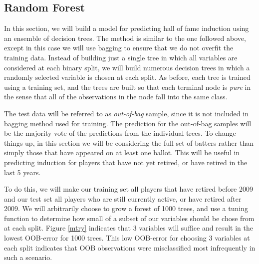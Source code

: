 \documentclass[preprint,12pt]{elsarticle}
\begin{document}


\subsection{Random Forest}
In this section, we will build a model for predicting hall of fame induction using an ensemble of decision trees. The method is similar to the one followed above, except in this case we will use bagging to ensure that we do not overfit the training data. Instead of building just a single tree in which all variables are considered at each binary split, we will build numerous decision trees in which a randomly selected variable is chosen at each split. As before, each tree is trained using a training set, and the trees are built so that each terminal node is \textit{pure} in the sense that all of the observations in the node fall into the same class.

The test data will be referred to as \textit{out-of-bag} sample, since it is not included in bagging method used for training. The prediction for the out-of-bag samples will be the majority vote of the predictions from the individual trees. To change things up, in this section we will be considering the full set of batters rather than simply those that have appeared on at least one ballot. This will be useful in predicting induction for players that have not yet retired, or have retired in the last 5 years.

To do this, we will make our training set all players that have retired before 2009 and our test set all players who are still currently active, or have retired after 2009. We will arbitrarily choose to grow a forest of 1000 trees, and use a tuning function to determine how small of a subset of our variables should be chose from at each split. Figure \ref{mtry} indicates that 3 variables will suffice and result in the lowest OOB-error for 1000 trees. This low OOB-error for choosing 3 variables at each split indicates that OOB observations were misclassified most infrequently in such a scenario.
\end{document}
